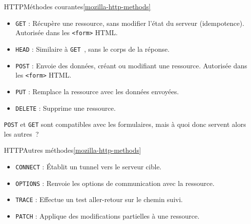 \documentclass{beamer}
\begin{document}
    \begin{frame}{HTTP}{Méthodes courantes\cref{mozilla-http-methods}}
        \begin{itemize}
            \item \lstinline{GET} : Récupère une ressource, sans modifier l'état du serveur (idempotence).
            Autorisée dans les \lstinline{<form>} HTML.
            \item \lstinline{HEAD} : Similaire à \lstinline{GET}~, sans le corps de la réponse.
            \item \lstinline{POST} : Envoie des données, créant ou modifiant une ressource.
            Autorisée dans les \lstinline{<form>} HTML.
            \item \lstinline{PUT} : Remplace la ressource avec les données envoyées.
            \item \lstinline{DELETE} : Supprime une ressource.
        \end{itemize}
        \begin{dangercolorbox}
            \lstinline{POST} et \lstinline{GET} sont compatibles avec les formulaires, mais à quoi donc servent alors les autres~?
        \end{dangercolorbox}
    \end{frame}

    \begin{frame}{HTTP}{Autres méthodes\cref{mozilla-http-methods}}
        \begin{itemize}
            \item \lstinline{CONNECT} : Établit un tunnel vers le serveur cible.
            \item \lstinline{OPTIONS} : Renvoie les options de communication avec la ressource.
            \item \lstinline{TRACE} : Effectue un test aller-retour sur le chemin suivi.
            \item \lstinline{PATCH} : Applique des modifications partielles à une ressource.
        \end{itemize}
    \end{frame}
\end{document}
